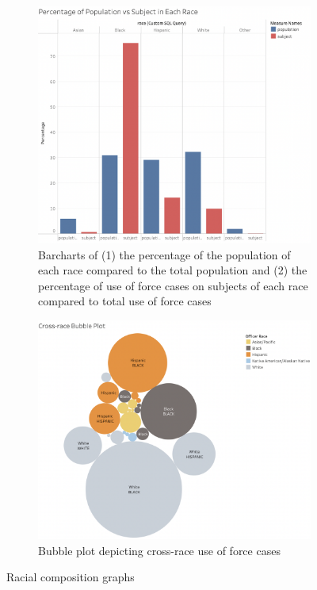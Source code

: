 \documentclass[10pt]{article}
\begin{document}
\begin{figure}[H]
\captionsetup{font=small}
    \begin{subfigure}{0.5\textwidth}
        \includegraphics[width=\textwidth]{img1}
        \caption{Barcharts of (1) the percentage of the population of each race compared to the total population and (2) the percentage of use of force cases on subjects of each race compared to total use of force cases}
        \label{img1}
    \end{subfigure}%
    \begin{subfigure}{0.5\textwidth}
        \includegraphics[width=\textwidth]{img3}
        \caption{Bubble plot depicting cross-race use of force cases}
        \label{img3}
    \end{subfigure}
\caption{Racial composition graphs}
\end{figure}
\end{document}
